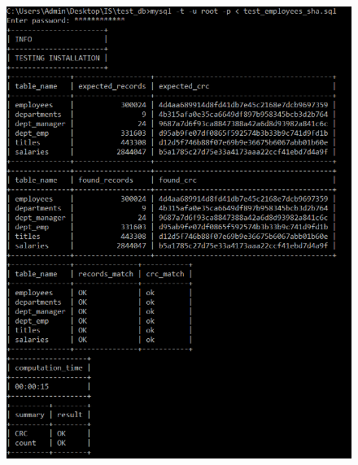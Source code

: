 \documentclass{article}
\begin{document}
\begin{figure}
\centering
\includegraphics[scale = 0.8]{test2.PNG}
\end{figure}
\end{document}
